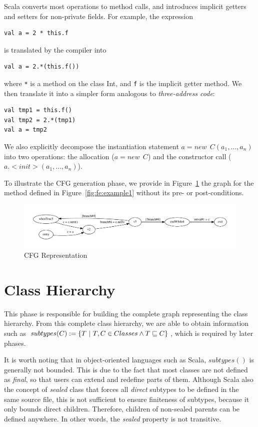 Scala converts most operations to method calls, and introduces implicit getters
and setters for non-private fields. For example, the expression 
\begin{lstlisting}
val a = 2 * this.f
\end{lstlisting}
is translated by the compiler into 
\begin{lstlisting}
val a = 2.*(this.f())
\end{lstlisting}
where \lstinline{*} is a method on the class Int, and \lstinline{f} is the implicit
getter method. We then translate it into a simpler form analogous to
\emph{three-address code}:
\begin{lstlisting}
val tmp1 = this.f()
val tmp2 = 2.*(tmp1)
val a = tmp2
\end{lstlisting}

We also explicitly decompose the instantiation statement $a = new~~ C(a_1, ...,
a_n)$ into two operations: the allocation ($a = new~~ C$) and the constructor
call ($a.<init>(a_1, ..., a_n)$).

To illustrate the CFG generation phase, we provide in
Figure~\ref{fig:cfg:example1} the graph for the method defined in
Figure~\ref{fig:fe:example1} without its pre- or post-conditions.

\begin{figure}[h]
    \centering

    \includegraphics[scale=0.50]{images/cfg_example2}

    \caption{CFG Representation}
    \label{fig:cfg:example1}
\end{figure}

\section{Class Hierarchy}
This phase is responsible for building the complete graph representing the
class hierarchy. From this complete class hierarchy, we are able to obtain
information such as $subtypes(C) := \{ T ~|~ T,C \in Classes \land T \sqsubseteq
C \}$, which is required by later phases.

It is worth noting that in object-oriented languages such as Scala,
$subtypes()$ is generally not bounded. This is due to the fact that most
classes are not defined as \emph{final}, so that users can extend and redefine
parts of them. Although Scala also the concept of \emph{sealed} class that forces
all \emph{direct} subtypes to be defined in the same source file, this 
is not sufficient to ensure finiteness of subtypes, because it only bounds
direct children. Therefore, children of non-sealed parents can be defined
anywhere. In other words, the \emph{sealed} property is not transitive.

